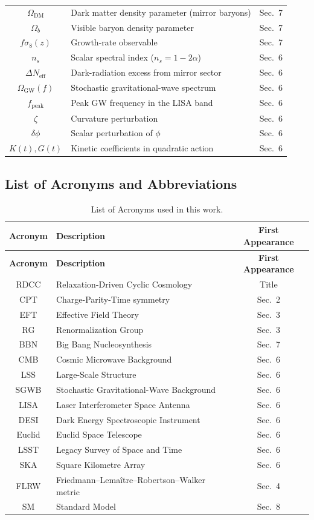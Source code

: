 \documentclass[11pt,a4paper]{article}
\begin{document}
\begin{longtable}{|c|p{9cm}|c|}
$\Omega_{\mathrm{DM}}$ & Dark matter density parameter (mirror baryons) & Sec.~7 \\
$\Omega_{b}$ & Visible baryon density parameter & Sec.~7 \\
$f\sigma_{8}(z)$ & Growth-rate observable & Sec.~7 \\
$n_{s}$ & Scalar spectral index ($n_{s}=1-2\alpha$) & Sec.~6 \\
$\Delta N_{\mathrm{eff}}$ & Dark-radiation excess from mirror sector & Sec.~6 \\
$\Omega_{\mathrm{GW}}(f)$ & Stochastic gravitational-wave spectrum & Sec.~6 \\
$f_{\mathrm{peak}}$ & Peak GW frequency in the LISA band & Sec.~6 \\
$\zeta$ & Curvature perturbation & Sec.~6 \\
$\delta\phi$ & Scalar perturbation of $\phi$ & Sec.~6 \\
$K(t), G(t)$ & Kinetic coefficients in quadratic action & Sec.~6 \\
\hline
\end{longtable}


\subsection*{List of Acronyms and Abbreviations}

\begin{longtable}{|c|p{10cm}|c|}
\caption{List of Acronyms used in this work.} \label{tab:acronyms} \\
\hline
\textbf{Acronym} & \textbf{Description} & \textbf{First Appearance} \\
\hline
\endfirsthead

\hline
\textbf{Acronym} & \textbf{Description} & \textbf{First Appearance} \\
\hline
\endhead

RDCC & Relaxation-Driven Cyclic Cosmology & Title \\
CPT & Charge-Parity-Time symmetry & Sec.~2 \\
EFT & Effective Field Theory & Sec.~3 \\
RG & Renormalization Group & Sec.~3 \\
BBN & Big Bang Nucleosynthesis & Sec.~7 \\
CMB & Cosmic Microwave Background & Sec.~6 \\
LSS & Large-Scale Structure & Sec.~6 \\
SGWB & Stochastic Gravitational-Wave Background & Sec.~6 \\
LISA & Laser Interferometer Space Antenna & Sec.~6 \\
DESI & Dark Energy Spectroscopic Instrument & Sec.~6 \\
Euclid & Euclid Space Telescope & Sec.~6 \\
LSST & Legacy Survey of Space and Time & Sec.~6 \\
SKA & Square Kilometre Array & Sec.~6 \\
FLRW & Friedmann–Lemaître–Robertson–Walker metric & Sec.~4 \\
SM & Standard Model & Sec.~8 \\
\hline
\end{longtable}
\end{document}
